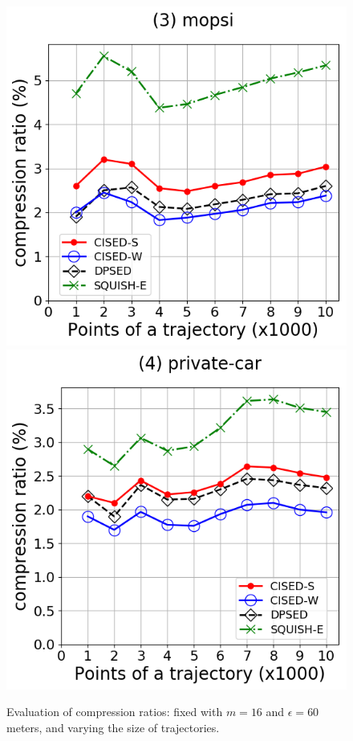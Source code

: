 {\begin{figure}[tb!]
\includegraphics[scale = 0.2900]{Figures/Exp-CR-size-mopsi.png}\hspace{1ex}
\includegraphics[scale = 0.2900]{Figures/Exp-CR-size-private.png}
\caption{\small Evaluation of compression ratios: fixed with $m=16$ and $\epsilon=60$ meters, and varying the size of trajectories.}
\label{fig:cr-size}
\end{figure}




}
